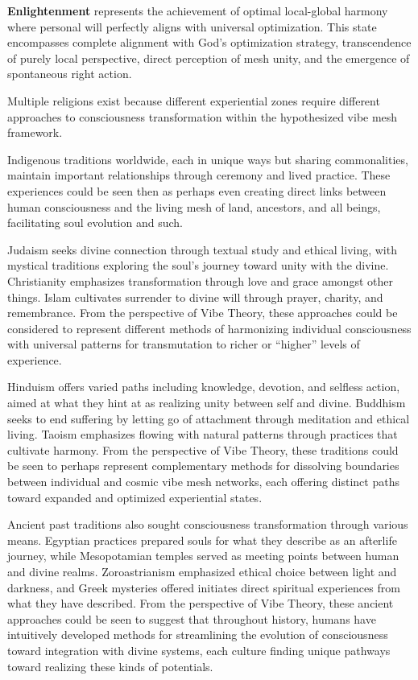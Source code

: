 \textbf{Enlightenment} represents the achievement of optimal local-global harmony where personal will perfectly aligns with universal optimization. This state encompasses complete alignment with God's optimization strategy, transcendence of purely local perspective, direct perception of mesh unity, and the emergence of spontaneous right action.

Multiple religions exist because different experiential zones require different approaches to consciousness transformation within the hypothesized vibe mesh framework.

Indigenous traditions worldwide, each in unique ways but sharing commonalities, maintain important relationships through ceremony and lived practice. These experiences could be seen then as perhaps even creating direct links between human consciousness and the living mesh of land, ancestors, and all beings, facilitating soul evolution and such.

Judaism seeks divine connection through textual study and ethical living, with mystical traditions exploring the soul's journey toward unity with the divine. Christianity emphasizes transformation through love and grace amongst other things. Islam cultivates surrender to divine will through prayer, charity, and remembrance. From the perspective of Vibe Theory, these approaches could be considered to represent different methods of harmonizing individual consciousness with universal patterns for transmutation to richer or ``higher'' levels of experience.

Hinduism offers varied paths including knowledge, devotion, and selfless action, aimed at what they hint at as realizing unity between self and divine. Buddhism seeks to end suffering by letting go of attachment through meditation and ethical living. Taoism emphasizes flowing with natural patterns through practices that cultivate harmony. From the perspective of Vibe Theory, these traditions could be seen to perhaps represent complementary methods for dissolving boundaries between individual and cosmic vibe mesh networks, each offering distinct paths toward expanded and optimized experiential states.

Ancient past traditions also sought consciousness transformation through various means. Egyptian practices prepared souls for what they describe as an afterlife journey, while Mesopotamian temples served as meeting points between human and divine realms. Zoroastrianism emphasized ethical choice between light and darkness, and Greek mysteries offered initiates direct spiritual experiences from what they have described. From the perspective of Vibe Theory, these ancient approaches could be seen to suggest that throughout history, humans have intuitively developed methods for streamlining the evolution of consciousness toward integration with divine systems, each culture finding unique pathways toward realizing these kinds of potentials.
